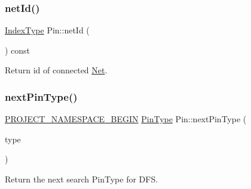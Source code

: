 \subsubsection{\texorpdfstring{net\+Id()}{netId()}}
{\footnotesize\ttfamily \hyperlink{type_8h_a581e8093e28e7362f2b6937296190676}{Index\+Type} Pin\+::net\+Id (\begin{DoxyParamCaption}{ }\end{DoxyParamCaption}) const\hspace{0.3cm}{\ttfamily [inline]}}

Return id of connected \hyperlink{classNet}{Net}. \mbox{\label{classPin_a86313ccf5cf94894c0d6cece183cb25d}} 
\subsubsection{\texorpdfstring{next\+Pin\+Type()}{nextPinType()}}
{\footnotesize\ttfamily \hyperlink{namespace_8h_ae48726a24dab2034454cf6d79e531eb8}{P\+R\+O\+J\+E\+C\+T\+\_\+\+N\+A\+M\+E\+S\+P\+A\+C\+E\+\_\+\+B\+E\+G\+IN} \hyperlink{type_8h_afaab50027002ecbb6c8ac27e727d1bb4}{Pin\+Type} Pin\+::next\+Pin\+Type (\begin{DoxyParamCaption}\item[{\hyperlink{type_8h_afaab50027002ecbb6c8ac27e727d1bb4}{Pin\+Type}}]{type }\end{DoxyParamCaption})\hspace{0.3cm}{\ttfamily [static]}}



Return the next search Pin\+Type for D\+FS. 


